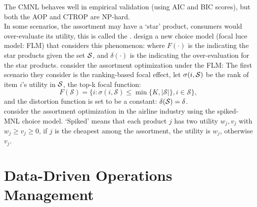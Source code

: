\documentclass[10pt]{report}
\begin{document}
The CMNL behaves well in empirical validation (using AIC and BIC scores), but both the AOP and CTROP are NP-hard. \\
In some scenarios, the assortment may have a `star' product, consumers would over-evaluate its utility, this is called the . 
\cite{kovach2022focal} design a new choice model (focal luce model: FLM) that considers this phenomenon:
where $F(\cdot)$ is the  indicating the star products given the set $\mathcal{S}$, and $\delta(\cdot)$ is the  indicating the over-evaluation for the star products. 
\cite{jiang2023assortment} consider the assortment optimization under the FLM:
The first scenario they consider is the ranking-based focal effect, let $\sigma(i,\mathcal{S})$ be the rank of item $i$'s utility in $\mathcal{S}$, the top-k focal function:
\[
    F(\mathcal{S})=\{i:\sigma(i,\mathcal{S})\leq\min\{K,|\mathcal{S}|\},i\in\mathcal{S}\},
\]
and the distortion function is set to be a constant: $\delta(\mathcal{S})=\delta$.\\
\cite{cao2022network} consider the assortment optimization in the airline industry using the spiked-MNL choice model. 
`Spiked' means that each product $j$ has two utility $w_j,v_j$ with $w_j\ge v_j\ge0$, if $j$ is the cheapest among the assortment, the utility is $w_j$, otherwise $v_j$. 

\clearpage
\section{Data-Driven Operations Management}
\end{document}
